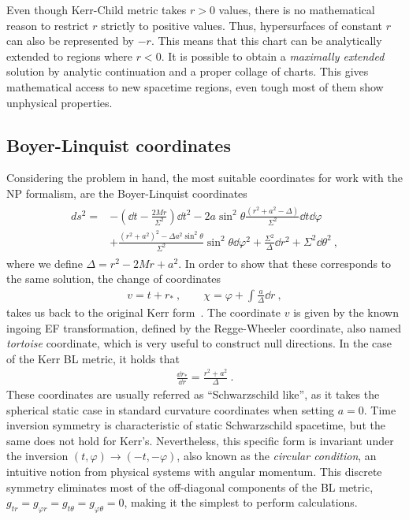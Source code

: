 Even though Kerr-Child metric takes $r>0$ values, there is no mathematical reason to restrict $r$ strictly to positive values.
Thus, hypersurfaces of constant $r$ can also be represented by $-r$. 
This means that this chart can be analytically extended to regions where $r<0$.
It is possible to obtain a \emph{maximally extended} solution by analytic continuation and a proper collage of charts.
This gives mathematical access to new spacetime regions, even tough most of them show unphysical properties.

\subsection{Boyer-Linquist coordinates}

Considering the problem in hand, the most suitable coordinates for work with the NP formalism, are the Boyer-Linquist coordinates
\begin{align}
    \begin{split}
        ds^2 = &- \left(\dd t - \frac{2 M r}{\Sigma^2} \right) \dd t^2 - 2 a \sin^2\theta \frac{(r^2+a^2-\Delta)}{\Sigma^2} \dd t \dd \varphi \\
        &+ \frac{(r^2+a^2)^2- \Delta a^2 \sin^2\theta}{\Sigma^2} \sin^2\theta \dd\varphi^2 + \frac{\Sigma^2}{\Delta} \dd r^2 + \Sigma^2 \dd \theta^2 ~,
    \end{split}
    \label{eq2:KerrBL}
\end{align}
where we define $\Delta=r^2-2 M r + a^2$. In order to show that these corresponds to the same solution, the change of coordinates
\begin{align}
    v = t + r_* ~, \qquad \chi = \varphi + \int \frac{a}{\Delta} \dd r ~,
    \label{eq2:InEFtoBL}
\end{align}
takes us back to the original Kerr form~.
The coordinate $v$ is given by the known ingoing EF transformation, defined by the Regge-Wheeler coordinate, also named \emph{tortoise} coordinate, which is very useful to construct null directions. In the case of the Kerr BL metric, it holds that
\begin{align}
    \frac{\dd r_*}{\dd r} = \frac{r^2+a^2}{\Delta} ~.
    \label{eq2:tortoise}
\end{align}
These coordinates are usually referred as ``Schwarzschild like'', as it takes the spherical static case in standard curvature coordinates when setting $a=0$. 
Time inversion symmetry is characteristic of static Schwarzschild spacetime, but the same does not hold for Kerr's.
Nevertheless, this specific form is invariant under the inversion $(t,\varphi)\to(-t,-\varphi)$, also known as the \emph{circular condition}, an intuitive notion from physical systems with angular momentum.
This discrete symmetry eliminates most of the off-diagonal components of the BL metric, $g_{tr} = g_{\varphi r} = g_{t \theta} = g_{\varphi \theta} = 0$, making it the simplest to perform calculations.

